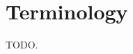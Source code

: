 \documentclass[../main.tex]{subfiles}
\begin{document}
\chapter*{Terminology}

TODO.\\\lipsum[6-8]
\end{document}
